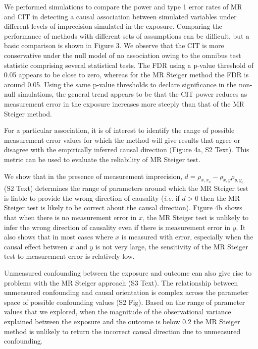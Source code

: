 \documentclass[]{article}
\begin{document}
We performed simulations to compare the power and type 1 error rates of
MR and CIT in detecting a causal association between simulated variables
under different levels of imprecision simulated in the exposure.
Comparing the performance of methods with different sets of assumptions
can be difficult, but a basic comparison is shown in Figure 3. We
observe that the CIT is more conservative under the null model of no
association owing to the omnibus test statistic comprising several
statistical tests. The FDR using a p-value threshold of 0.05 appears to
be close to zero, whereas for the MR Steiger method the FDR is around
0.05. Using the same p-value thresholds to declare significance in the
non-null simulations, the general trend appears to be that the CIT power
reduces as measurement error in the exposure increases more steeply than
that of the MR Steiger method.

For a particular association, it is of interest to identify the range of
possible measurement error values for which the method will give results
that agree or disagree with the empirically inferred causal direction
(Figure 4a, S2 Text). This metric can be used to evaluate the
reliability of MR Steiger test.

We show that in the presence of measurement imprecision,
\(d = \rho_{x, x_o} - \rho_{x,y}\rho_{y,y_o}\) (S2 Text) determines the
range of parameters around which the MR Steiger test is liable to
provide the wrong direction of causality (\emph{i.e.} if \(d>0\) then
the MR Steiger test is likely to be correct about the causal direction).
Figure 4b shows that when there is no measurement error in \(x\), the MR
Steiger test is unlikely to infer the wrong direction of causality even
if there is measurement error in \(y\). It also shows that in most cases
where \(x\) is measured with error, especially when the causal effect
between \(x\) and \(y\) is not very large, the sensitivity of the MR
Steiger test to measurement error is relatively low.

Unmeasured confounding between the exposure and outcome can also give
rise to problems with the MR Steiger approach (S3 Text). The
relationship between unmeasured confounding and causal orientation is
complex across the parameter space of possible confounding values (S2
Fig). Based on the range of parameter values that we explored, when the
magnitude of the observational variance explained between the exposure
and the outcome is below 0.2 the MR Steiger method is unlikely to return
the incorrect causal direction due to unmeasured confounding.
\end{document}
